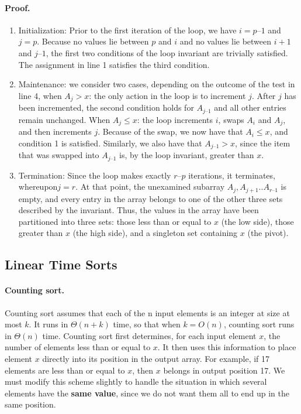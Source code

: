 \paragraph{Proof.}
\begin{enumerate}
  \item Initialization: Prior to the first iteration of the loop, we have $i = p – 1$ and $ j= p$. Because no values lie between $p$ and $i$ and no values lie between $i + 1$ and $j – 1$, the first two conditions of the loop invariant are trivially satisfied. The assignment in line 1 satisfies the third condition.
  \item Maintenance: we consider two cases, depending on the outcome of the test in line 4, when $A_{j} > x$: the only action in the loop is to increment $j$. After $j$  has been incremented, the second condition holds for $A_{j – 1}$ and all other entries remain unchanged. When $A_{j} \le x$: the loop increments $i$, swaps $A_{i}$ and $A_{j}$, and then increments $j$. Because of the swap, we now have that $A_{i} \le x$, and condition 1 is satisfied. Similarly, we also have that $A_{j – 1} > x$, since the item that was swapped into $A_{j – 1}$ is, by the loop invariant, greater than $x$.
  \item Termination: Since the loop makes exactly $r – p$ iterations, it terminates, whereupon$ j= r$. At that point, the unexamined subarray $A_{j}, A_{j+1}..  A_{r – 1}$ is empty, and every entry in the array belongs to one of the other three sets described by the invariant. Thus, the values in the array have been partitioned into three sets: those less than or equal to $x$ (the low side), those greater than $x$ (the high side), and a singleton set containing $x$ (the pivot).


\end{enumerate}



\subsection{Linear Time Sorts}
\paragraph{ Counting sort.} Counting sort assumes that each of the n input elements is an integer at size at most $k$. It runs in $\Theta \left(n + k\right)$ time, so that when $k = O(n)$, counting sort runs in $\Theta\left(n\right)$ time.
Counting sort first determines, for each input element $x$, the number of elements less than or equal to $x$. It then uses this information to place element $x$ directly into its position in the output array. For example, if 17 elements are less than or equal to $x$, then $x$ belongs in output position 17. We must modify this scheme slightly to handle the situation in which several elements have the \textbf{same value}, since we do not want them all to end up in the same position.

